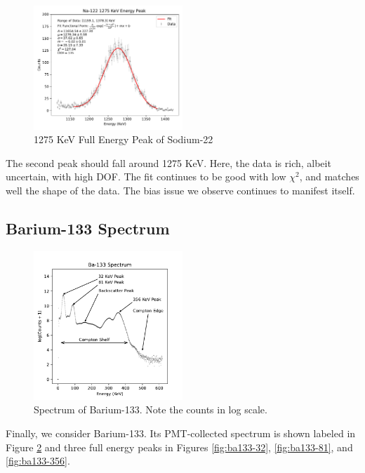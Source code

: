 \documentclass[12pt, letterpaper]{article}
\begin{document}
\begin{figure}[h]
    \centering
    \includegraphics[width=0.5\textwidth]{experiment1/figures/na22/peak-1275.pdf}
    \caption{1275 KeV Full Energy Peak of Sodium-22}
    \label{fig:na22-1275}
\end{figure}

The second peak should fall around 1275 KeV. Here, the data is rich, albeit uncertain, with high DOF. The fit continues to be good with low $\chi^2$, and matches well the shape of the data. The bias issue we observe continues to manifest itself. 


\subsection{Barium-133 Spectrum}

\begin{figure}[h]
    \centering
    \includegraphics[width=0.5\textwidth]{experiment1/figures/ba133/spectrum.pdf}
    \caption{Spectrum of Barium-133. Note the counts in log scale.}
    \label{fig:ba133-spectrum}
\end{figure}

Finally, we consider Barium-133. Its PMT-collected spectrum is shown labeled in Figure \ref{fig:ba133-spectrum} and three full energy peaks in Figures \ref{fig:ba133-32}, \ref{fig:ba133-81}, and \ref{fig:ba133-356}. 
\end{document}
